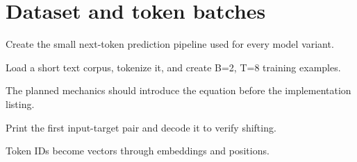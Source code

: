 \section{Dataset and token batches}
\label{sec:ch02-dataset-and-token-batches}

Create the small next-token prediction pipeline used for every model variant.



Load a short text corpus, tokenize it, and create B=2, T=8 training examples.



The planned mechanics should introduce the equation before the implementation listing.





\begin{checkpointbox}
Print the first input-target pair and decode it to verify shifting.
\end{checkpointbox}

Token IDs become vectors through embeddings and positions.
